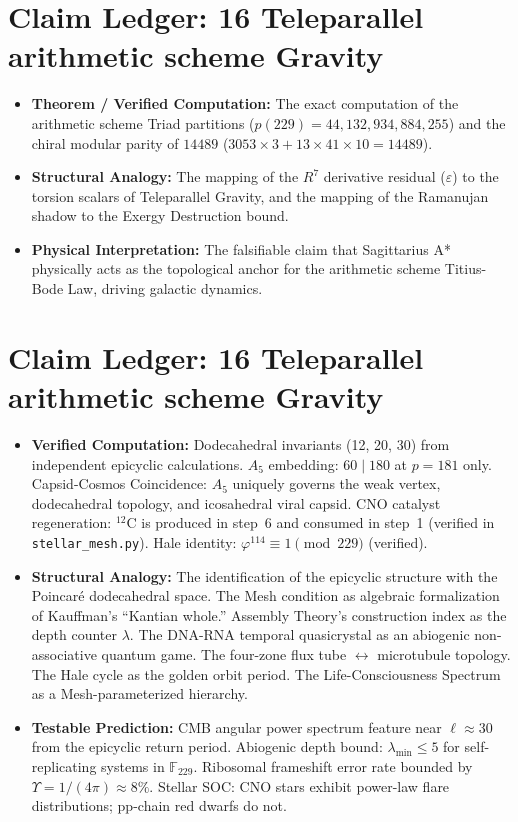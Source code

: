 \section*{Claim Ledger: 16 Teleparallel arithmetic scheme Gravity}
\begin{itemize}
    \item \textbf{Theorem / Verified Computation:} The exact computation of the arithmetic scheme Triad partitions ($p(229) = 44,132,934,884,255$) and the chiral modular parity of $14489$ ($3053 \times 3 + 13 \times 41 \times 10 = 14489$).
    \item \textbf{Structural Analogy:} The mapping of the $R^7$ derivative residual ($\varepsilon$) to the torsion scalars of Teleparallel Gravity, and the mapping of the Ramanujan shadow to the Exergy Destruction bound.
    \item \textbf{Physical Interpretation:} The falsifiable claim that Sagittarius A* physically acts as the topological anchor for the arithmetic scheme Titius-Bode Law, driving galactic dynamics.
\end{itemize}

\section*{Claim Ledger: 16 Teleparallel arithmetic scheme Gravity}
\begin{itemize}
    \item \textbf{Verified Computation:} Dodecahedral invariants (12, 20, 30) from independent epicyclic calculations. $A_5$ embedding: $60 \mid 180$ at $p = 181$ only. Capsid-Cosmos Coincidence: $A_5$ uniquely governs the weak vertex, dodecahedral topology, and icosahedral viral capsid. CNO catalyst regeneration: ${}^{12}\mathrm{C}$ is produced in step~6 and consumed in step~1 (verified in \texttt{stellar\_mesh.py}). Hale identity: $\varphi^{114} \equiv 1 \pmod{229}$ (verified).
    \item \textbf{Structural Analogy:} The identification of the epicyclic structure with the Poincar\'{e} dodecahedral space. The Mesh condition as algebraic formalization of Kauffman's ``Kantian whole.'' Assembly Theory's construction index as the depth counter $\lambda$. The DNA-RNA temporal quasicrystal as an abiogenic non-associative quantum game. The four-zone flux tube $\leftrightarrow$ microtubule topology. The Hale cycle as the golden orbit period. The Life-Consciousness Spectrum as a Mesh-parameterized hierarchy.
    \item \textbf{Testable Prediction:} CMB angular power spectrum feature near $\ell \approx 30$ from the epicyclic return period. Abiogenic depth bound: $\lambda_{\min} \leq 5$ for self-replicating systems in $\mathbb{F}_{229}$. Ribosomal frameshift error rate bounded by $\Upsilon = 1/(4\pi) \approx 8\%$. Stellar SOC: CNO stars exhibit power-law flare distributions; pp-chain red dwarfs do not.
\end{itemize}

